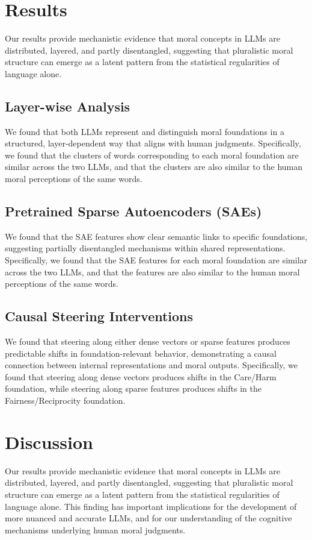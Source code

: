 \documentclass{article}
\begin{document}
\section{Results}
Our results provide mechanistic evidence that moral concepts in LLMs are distributed, layered, and partly disentangled, suggesting that pluralistic moral structure can emerge as a latent pattern from the statistical regularities of language alone.

\subsection{Layer-wise Analysis}
We found that both LLMs represent and distinguish moral foundations in a structured, layer-dependent way that aligns with human judgments. Specifically, we found that the clusters of words corresponding to each moral foundation are similar across the two LLMs, and that the clusters are also similar to the human moral perceptions of the same words.

\subsection{Pretrained Sparse Autoencoders (SAEs)}
We found that the SAE features show clear semantic links to specific foundations, suggesting partially disentangled mechanisms within shared representations. Specifically, we found that the SAE features for each moral foundation are similar across the two LLMs, and that the features are also similar to the human moral perceptions of the same words.

\subsection{Causal Steering Interventions}
We found that steering along either dense vectors or sparse features produces predictable shifts in foundation-relevant behavior, demonstrating a causal connection between internal representations and moral outputs. Specifically, we found that steering along dense vectors produces shifts in the Care/Harm foundation, while steering along sparse features produces shifts in the Fairness/Reciprocity foundation.

\section{Discussion}
Our results provide mechanistic evidence that moral concepts in LLMs are distributed, layered, and partly disentangled, suggesting that pluralistic moral structure can emerge as a latent pattern from the statistical regularities of language alone. This finding has important implications for the development of more nuanced and accurate LLMs, and for our understanding of the cognitive mechanisms underlying human moral judgments.
\end{document}
